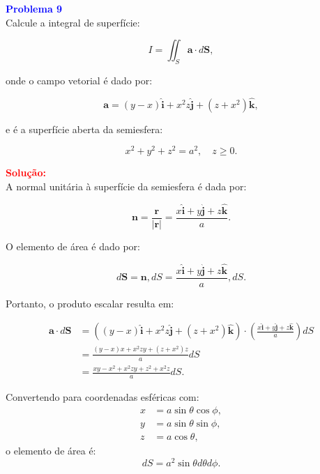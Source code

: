 \documentclass[a4paper,12pt]{article}
\begin{document}
\begin{flushleft}
\textbf{\textcolor{blue}{Problema 9}}\\
Calcule a integral de superfície:

\begin{equation}
I = \iint_S \mathbf{a} \cdot d\mathbf{S},
\end{equation}

onde o campo vetorial  é dado por:

\begin{equation}
\mathbf{a} = (y - x) \hat{\mathbf{i}} + x^2z \hat{\mathbf{j}} + (z + x^2) \hat{\mathbf{k}},
\end{equation}

e  é a superfície aberta da semiesfera:

\begin{equation}
x^2 + y^2 + z^2 = a^2, \quad z \geq 0.
\end{equation}

\textcolor{red}{\textbf{Solução:}}\\

A normal unitária à superfície da semiesfera é dada por:

\begin{equation}
\mathbf{n} = \frac{\mathbf{r}}{|\mathbf{r}|} = \frac{x \hat{\mathbf{i}} + y \hat{\mathbf{j}} + z \hat{\mathbf{k}}}{a}.
\end{equation}

O elemento de área é dado por:

\begin{equation}
d\mathbf{S} = \mathbf{n} , dS = \frac{x \hat{\mathbf{i}} + y \hat{\mathbf{j}} + z \hat{\mathbf{k}}}{a} , dS.
\end{equation}

Portanto, o produto escalar  resulta em:

\begin{align}
\mathbf{a} \cdot d\mathbf{S} &= \left( (y - x) \hat{\mathbf{i}} + x^2z \hat{\mathbf{j}} + (z + x^2) \hat{\mathbf{k}} \right) \cdot \left( \frac{x \hat{\mathbf{i}} + y \hat{\mathbf{j}} + z \hat{\mathbf{k}}}{a} \right) dS \\
&= \frac{(y - x)x + x^2z y + (z + x^2)z}{a} dS \\
&= \frac{xy - x^2 + x^2 z y + z^2 + x^2 z}{a} dS.
\end{align}

Convertendo para coordenadas esféricas com:
\begin{align}
x &= a \sin \theta \cos \phi, \\
y &= a \sin \theta \sin \phi, \\
z &= a \cos \theta,
\end{align}
o elemento de área é:
\begin{equation}
dS = a^2 \sin \theta d\theta d\phi.
\end{equation}


\end{flushleft}
\end{document}
